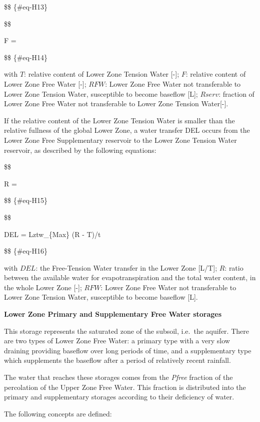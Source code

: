 \documentclass[
  letterpaper,
  DIV=11,
  numbers=noendperiod]{scrreprt}
\begin{document}
\$\$ \{\#eq-H13\}

\$\$

F = 

\$\$ \{\#eq-H14\}

with \(T\): relative content of Lower Zone Tension Water {[}-{]}; \(F\):
relative content of Lower Zone Free Water {[}-{]}; \(RFW\): Lower Zone
Free Water not transferable to Lower Zone Tension Water, susceptible to
become baseflow {[}L{]}; \(Rserv\): fraction of Lower Zone Free Water
not transferable to Lower Zone Tension Water{[}-{]}.

If the relative content of the Lower Zone Tension Water is smaller than
the relative fullness of the global Lower Zone, a water transfer DEL
occurs from the Lower Zone Free Supplementary reservoir to the Lower
Zone Tension Water reservoir, as described by the following equations:

\$\$

R =

\$\$ \{\#eq-H15\}

\$\$

DEL = Lztw\_\{Max\} \cdot {}(R - T)/t

\$\$ \{\#eq-H16\}

with \(DEL\): the Free-Tension Water transfer in the Lower Zone
{[}L/T{]}; \(R\): ratio between the available water for
evapotranspiration and the total water content, in the whole Lower Zone
{[}-{]}; \(RFW\): Lower Zone Free Water not transferable to Lower Zone
Tension Water, susceptible to become baseflow {[}L{]}.

\textbf{Lower Zone Primary and Supplementary Free Water storages}

This storage represents the saturated zone of the subsoil, i.e.~the
aquifer. There are two types of Lower Zone Free Water: a primary type
with a very slow draining providing baseflow over long periods of time,
and a supplementary type which supplements the baseflow after a period
of relatively recent rainfall.

The water that reaches these storages comes from the \emph{Pfree}
fraction of the percolation of the Upper Zone Free Water. This fraction
is distributed into the primary and supplementary storages according to
their deficiency of water.

The following concepts are defined:
\end{document}
